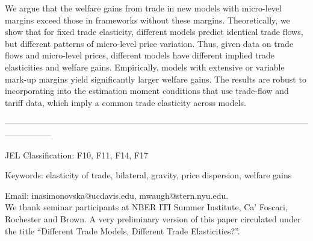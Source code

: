 \documentclass[12pt,dvips, ps2pdf]{article}
\begin{document}
\begin{onehalfspacing}

We argue that the welfare gains from trade in new models with micro-level margins exceed those in frameworks without these margins. Theoretically, we show that for fixed trade elasticity, different models predict identical trade flows, but different patterns of micro-level price variation. Thus, given data on trade flows and micro-level prices, different models have different implied trade elasticities and welfare gains. Empirically, models with extensive or variable mark-up margins yield significantly larger welfare gains. The results are robust to incorporating into the estimation moment conditions that use trade-flow and tariff data, which imply a common trade elasticity across models.

-----------------------------------------------------------------------------------------------------------------------------
\vspace{0.5cm}

JEL Classification: F10, F11, F14, F17


Keywords: elasticity of trade, bilateral, gravity, price dispersion, welfare gains

\vspace{0.5cm}

\footnotesize Email: inasimonovska@ucdavis.edu, mwaugh@stern.nyu.edu.\\We thank seminar participants at NBER ITI Summer Institute, Ca' Foscari, Rochester and Brown.  A very preliminary version of this paper circulated under the title ``Different Trade Models, Different Trade Elasticities?''.



\end{onehalfspacing}
\end{document}
